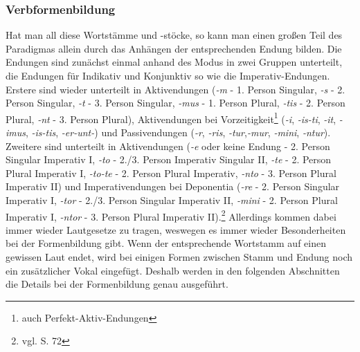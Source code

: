 \subsubsection{Verbformenbildung}
Hat man all diese Wortstämme und -stöcke, so kann man einen großen Teil des Paradigmas allein durch das Anhängen der entsprechenden Endung bilden. Die Endungen sind zunächst einmal anhand des Modus in zwei Gruppen unterteilt, die Endungen für Indikativ und Konjunktiv so wie die Imperativ-Endungen. Erstere sind wieder unterteilt in Aktivendungen (\textit{-m} - 1. Person Singular, \textit{-s} - 2. Person Singular, \textit{-t} - 3. Person Singular, \textit{-mus} - 1. Person Plural, \textit{-tis} - 2. Person Plural, \textit{-nt} - 3. Person Plural), Aktivendungen bei Vorzeitigkeit\footnote{auch Perfekt-Aktiv-Endungen} (\textit{-i}, \textit{-is-ti}, \textit{-it}, \textit{-imus}, \textit{-is-tis}, \textit{-er-unt-}) und Passivendungen (\textit{-r}, \textit{-ris}, \textit{-tur},\textit{-mur}, \textit{-mini}, \textit{-ntur}). Zweitere sind unterteilt in Aktivendungen (\textit{-e} oder keine Endung - 2. Person Singular Imperativ I, \textit{-to} - 2./3. Person Imperativ Singular II, \textit{-te} - 2. Person Plural Imperativ I, \textit{-to-te} - 2. Person Plural Imperativ, \textit{-nto} - 3. Person Plural Imperativ II) und Imperativendungen bei Deponentia (\textit{-re} - 2. Person Singular Imperativ I, \textit{-tor} - 2./3. Person Singular Imperativ II, \textit{-mini} - 2. Person Plural Imperativ I, \textit{-ntor} - 3. Person Plural Imperativ II).\footnote{vgl. \cite{BAYER-LINDAUER1994} S. 72} Allerdings kommen dabei immer wieder Lautgesetze zu tragen, weswegen es immer wieder Besonderheiten bei der Formenbildung gibt. Wenn der entsprechende Wortstamm auf einen gewissen Laut endet, wird bei einigen Formen zwischen Stamm und Endung noch ein zusätzlicher Vokal eingefügt. Deshalb werden in den folgenden Abschnitten die Details bei der Formenbildung genau ausgeführt.\par
\FloatBarrier
